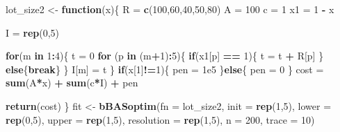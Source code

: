 \documentclass[]{ctexbook}
\newenvironment{Shaded}{\begin{snugshade}}{\end{snugshade}}
\newcommand{\KeywordTok}[1]{\textcolor[rgb]{0.13,0.29,0.53}{\textbf{#1}}}
\newcommand{\DataTypeTok}[1]{\textcolor[rgb]{0.13,0.29,0.53}{#1}}
\newcommand{\DecValTok}[1]{\textcolor[rgb]{0.00,0.00,0.81}{#1}}
\newcommand{\FloatTok}[1]{\textcolor[rgb]{0.00,0.00,0.81}{#1}}
\newcommand{\StringTok}[1]{\textcolor[rgb]{0.31,0.60,0.02}{#1}}
\newcommand{\ControlFlowTok}[1]{\textcolor[rgb]{0.13,0.29,0.53}{\textbf{#1}}}
\newcommand{\OperatorTok}[1]{\textcolor[rgb]{0.81,0.36,0.00}{\textbf{#1}}}
\newcommand{\NormalTok}[1]{#1}
\begin{document}
\begin{Shaded}
\begin{Highlighting}[]
\NormalTok{lot_size2 <-}\StringTok{ }\ControlFlowTok{function}\NormalTok{(x)\{}
\NormalTok{  R =}\StringTok{ }\KeywordTok{c}\NormalTok{(}\DecValTok{100}\NormalTok{,}\DecValTok{60}\NormalTok{,}\DecValTok{40}\NormalTok{,}\DecValTok{50}\NormalTok{,}\DecValTok{80}\NormalTok{)}
\NormalTok{  A =}\StringTok{ }\DecValTok{100}
\NormalTok{  c =}\StringTok{ }\DecValTok{1}
\NormalTok{  x1 =}\StringTok{ }\DecValTok{1} \OperatorTok{-}\StringTok{ }\NormalTok{x}

\NormalTok{  I =}\StringTok{ }\KeywordTok{rep}\NormalTok{(}\DecValTok{0}\NormalTok{,}\DecValTok{5}\NormalTok{)}

  \ControlFlowTok{for}\NormalTok{(m }\ControlFlowTok{in} \DecValTok{1}\OperatorTok{:}\DecValTok{4}\NormalTok{)\{}
\NormalTok{    t =}\StringTok{ }\DecValTok{0}
    \ControlFlowTok{for}\NormalTok{ (p }\ControlFlowTok{in}\NormalTok{ (m}\OperatorTok{+}\DecValTok{1}\NormalTok{)}\OperatorTok{:}\DecValTok{5}\NormalTok{)\{}
      \ControlFlowTok{if}\NormalTok{(x1[p] }\OperatorTok{==}\StringTok{ }\DecValTok{1}\NormalTok{)\{}
\NormalTok{        t =}\StringTok{ }\NormalTok{t }\OperatorTok{+}\StringTok{ }\NormalTok{R[p]}
\NormalTok{      \}}
      \ControlFlowTok{else}\NormalTok{\{}\ControlFlowTok{break}\NormalTok{\}}
\NormalTok{    \}}
\NormalTok{    I[m] =}\StringTok{ }\NormalTok{t}
\NormalTok{  \}}
  \ControlFlowTok{if}\NormalTok{(x[}\DecValTok{1}\NormalTok{]}\OperatorTok{!=}\DecValTok{1}\NormalTok{)\{}
\NormalTok{    pen =}\StringTok{ }\FloatTok{1e5}
\NormalTok{  \}}\ControlFlowTok{else}\NormalTok{\{}
\NormalTok{    pen =}\StringTok{ }\DecValTok{0}
\NormalTok{  \}}
\NormalTok{  cost =}\StringTok{ }\KeywordTok{sum}\NormalTok{(A}\OperatorTok{*}\NormalTok{x) }\OperatorTok{+}\StringTok{ }\KeywordTok{sum}\NormalTok{(c}\OperatorTok{*}\NormalTok{I) }\OperatorTok{+}\StringTok{ }\NormalTok{pen}

  \KeywordTok{return}\NormalTok{(cost)}
\NormalTok{\}}
\NormalTok{fit <-}\StringTok{ }\KeywordTok{bBASoptim}\NormalTok{(}\DataTypeTok{fn =}\NormalTok{ lot_size2,}
                 \DataTypeTok{init =} \KeywordTok{rep}\NormalTok{(}\DecValTok{1}\NormalTok{,}\DecValTok{5}\NormalTok{),}
                 \DataTypeTok{lower =} \KeywordTok{rep}\NormalTok{(}\DecValTok{0}\NormalTok{,}\DecValTok{5}\NormalTok{),}
                 \DataTypeTok{upper =} \KeywordTok{rep}\NormalTok{(}\DecValTok{1}\NormalTok{,}\DecValTok{5}\NormalTok{),}
                 \DataTypeTok{resolution =} \KeywordTok{rep}\NormalTok{(}\DecValTok{1}\NormalTok{,}\DecValTok{5}\NormalTok{),}
                 \DataTypeTok{n =} \DecValTok{200}\NormalTok{,}
                 \DataTypeTok{trace =} \DecValTok{10}\NormalTok{)}
\end{Highlighting}
\end{Shaded}
\end{document}
